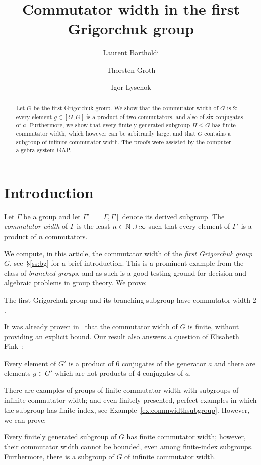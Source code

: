 \documentclass[a4paper,11pt]{amsart}
\begin{document}
\title{Commutator width in the first Grigorchuk group}
\author{Laurent Bartholdi}
\author{Thorsten Groth}
\author{Igor Lysenok}
\begin{abstract}
  Let $G$ be the first Grigorchuk group.  We show that the commutator
  width of $G$ is $2$: every element $g\in [G,G]$ is a product of two
  commutators, and also of six conjugates of $a$. Furthermore, we show
  that every finitely generated subgroup $H\leq G$ has finite
  commutator width, which however can be arbitrarily large, and that
  $G$ contains a subgroup of infinite commutator width. The proofs
  were assisted by the computer algebra system GAP.
\end{abstract}
\maketitle

\section{Introduction}
Let $\Gamma$ be a group and let $\Gamma'=[\Gamma,\Gamma]$ denote its
derived subgroup. The \emph{commutator width} of $\Gamma$ is the least
$n\in \mathbb{N}\cup \infty$ such that every element of $\Gamma'$ is a
product of $n$ commutators.

We compute, in this article, the commutator width of the \emph{first
  Grigorchuk group} $G$, see~\S\ref{ss:bg} for a brief
introduction. This is a prominent example from the class of
\emph{branched groups}, and as such is a good testing ground for
decision and algebraic problems in group theory. We prove:
\begin{thma}\label{thm:CWGrigorchukGroup}
  The first Grigorchuk group and its branching subgroup have
  commutator width $2$.
\end{thma}
It was already proven in~\cite{Lysenok-Miasnikov-Ushakov:QuadraticEquationsInGrig} that
the commutator width of $G$ is finite, 
without providing an explicit bound.
Our result also
answers a question of Elisabeth
Fink~\cite[Question~3]{Fink:Conjugacy_growth}:
\begin{cora}\label{cor:productOf6Conjugates}
  Every element of $G'$ is a product of $6$ conjugates of the
  generator $a$ and there are elements $g\in G'$ which are 
  not products of $4$ conjugates of $a$.
\end{cora}


There are examples of groups of finite commutator width with subgroups
of infinite commutator width; and even finitely presented, perfect
examples in which the subgroup has finite index, see
Example~\ref{ex:commwidthsubgroup}. However, we can prove:
\begin{thma}\label{thm:subgroups}
  Every finitely generated subgroup of $G$ has finite commutator
  width; however, their commutator width cannot be bounded, even among
  finite-index subgroups. Furthermore, there is a subgroup of $G$ of infinite commutator width.
\end{thma}
\end{document}
